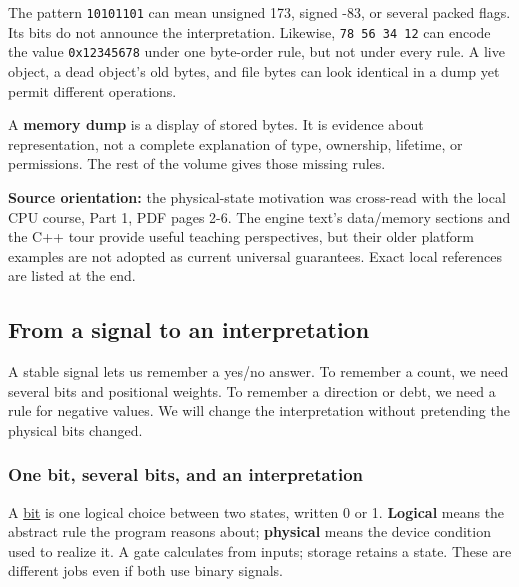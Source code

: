 The pattern \texttt{10101101} can mean unsigned 173, signed -83, or several packed flags. Its bits do not announce the interpretation. Likewise, \texttt{78\ 56\ 34\ 12} can encode the value \texttt{0x12345678} under one byte-order rule, but not under every rule. A live object, a dead object's old bytes, and file bytes can look identical in a dump yet permit different operations.

A \textbf{memory dump} is a display of stored bytes. It is evidence about representation, not a complete explanation of type, ownership, lifetime, or permissions. The rest of the volume gives those missing rules.

\textbf{Source orientation:} the physical-state motivation was cross-read with the local CPU course, Part 1, PDF pages 2-6. The engine text's data/memory sections and the C++ tour provide useful teaching perspectives, but their older platform examples are not adopted as current universal guarantees. Exact local references are listed at the end.

\subsection{From a signal to an interpretation}\label{01-foundations-i-ch001-from-a-signal-to-an-interpretation}

\hypertarget{01-foundations-i-ch001-from-a-signal-to-an-interpretation}{}

A stable signal lets us remember a yes/no answer. To remember a count, we need several bits and positional weights. To remember a direction or debt, we need a rule for negative values. We will change the interpretation without pretending the physical bits changed.

\subsubsection{One bit, several bits, and an interpretation}\label{01-foundations-i-ch001-one-bit-several-bits-and-an-interpretation}

\hypertarget{01-foundations-i-ch001-one-bit-several-bits-and-an-interpretation}{}

A \hyperref[appendix-ddbb69998a2e]{bit} is one logical choice between two states, written 0 or 1. \textbf{Logical} means the abstract rule the program reasons about; \textbf{physical} means the device condition used to realize it. A gate calculates from inputs; storage retains a state. These are different jobs even if both use binary signals.

